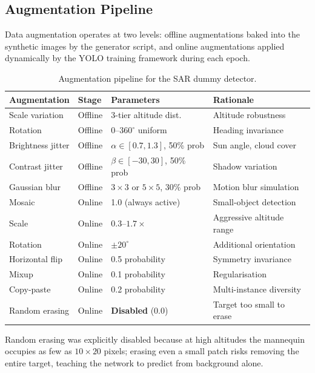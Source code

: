 \documentclass[10pt,a4paper]{article}
\begin{document}
\subsection{Augmentation Pipeline}

Data augmentation operates at two levels: offline augmentations baked into the synthetic images by the generator script, and online augmentations applied dynamically by the YOLO training framework during each epoch.

\begin{table}[ht]
  \centering
  \caption{Augmentation pipeline for the SAR dummy detector.}\label{tab:augmentation}
  \begin{tabular}{@{}llll@{}}
    \toprule
    \textbf{Augmentation} & \textbf{Stage} & \textbf{Parameters} & \textbf{Rationale} \\
    \midrule
    Scale variation & Offline & 3-tier altitude dist. & Altitude robustness \\
    Rotation & Offline & $0$--$360^{\circ}$ uniform & Heading invariance \\
    Brightness jitter & Offline & $\alpha \in [0.7, 1.3]$, 50\% prob & Sun angle, cloud cover \\
    Contrast jitter & Offline & $\beta \in [-30, 30]$, 50\% prob & Shadow variation \\
    Gaussian blur & Offline & $3 \times 3$ or $5 \times 5$, 30\% prob & Motion blur simulation \\
    \midrule
    Mosaic & Online & 1.0 (always active) & Small-object detection \\
    Scale & Online & $0.3$--$1.7\times$ & Aggressive altitude range \\
    Rotation & Online & $\pm 20^{\circ}$ & Additional orientation \\
    Horizontal flip & Online & 0.5 probability & Symmetry invariance \\
    Mixup & Online & 0.1 probability & Regularisation \\
    Copy-paste & Online & 0.2 probability & Multi-instance diversity \\
    Random erasing & Online & \textbf{Disabled} (0.0) & Target too small to erase \\
    \bottomrule
  \end{tabular}
\end{table}

Random erasing was explicitly disabled because at high altitudes the mannequin occupies as few as $10 \times 20$ pixels; erasing even a small patch risks removing the entire target, teaching the network to predict from background alone.
\end{document}
